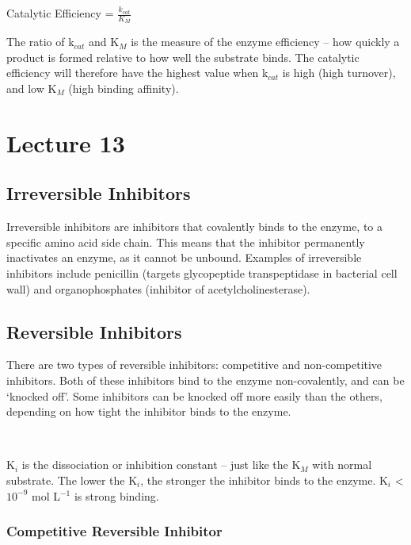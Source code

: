 \documentclass[a4paper, 12pt]{report}
\newcommand{\mychapter}[2]{
    \setcounter{chapter}{#1}
    \setcounter{section}{0}
    \chapter*{#2}
    \addcontentsline{toc}{chapter}{#2}
}
\begin{document}
\begin{center}
Catalytic Efficiency = $\frac{k_{cat}}{K_M}$
\end{center}

The ratio of k$_{cat}$ and K$_M$ is the measure of the enzyme efficiency -- how quickly a product is formed relative to how well the substrate binds.
The catalytic efficiency will therefore have the highest value when k$_{cat}$ is high (high turnover), and low K$_M$ (high binding affinity).

\mychapter{13}{Lecture 13}

\section{Irreversible Inhibitors}

Irreversible inhibitors are inhibitors that covalently binds to the enzyme, to a specific amino acid side chain.
This means that the inhibitor permanently inactivates an enzyme, as it cannot be unbound.
Examples of irreversible inhibitors include penicillin (targets glycopeptide transpeptidase in bacterial cell wall) and organophosphates (inhibitor of acetylcholinesterase).

\section{Reversible Inhibitors}

There are two types of reversible inhibitors: competitive and non-competitive inhibitors.
Both of these inhibitors bind to the enzyme non-covalently, and can be `knocked off'.
Some inhibitors can be knocked off more easily than the others, depending on how tight the inhibitor binds to the enzyme.

\begin{center}
\\

\vspace{0.5cm}

\end{center}

K$_i$ is the dissociation or inhibition constant -- just like the K$_M$ with normal substrate.
The lower the K$_i$, the stronger the inhibitor binds to the enzyme.
K$_i$ \textless{} $10^{-9}$ mol L$^{-1}$ is strong binding.

\subsection{Competitive Reversible Inhibitor}
\end{document}
